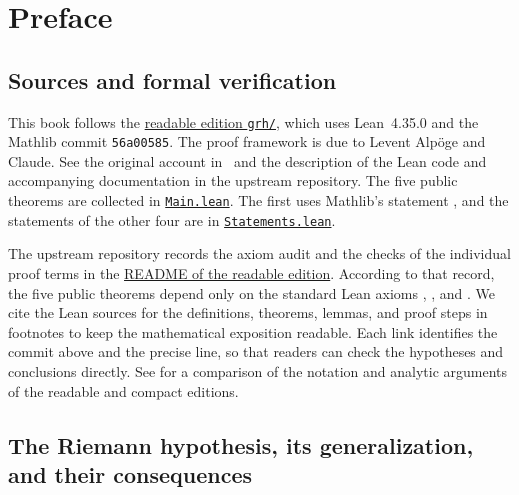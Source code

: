 \chapter*{Preface}

\section*{Sources and formal verification}

This book follows the
\href{https://github.com/lsernau/grh-lean/tree/72fead102f663d5c7a407964a13dc0cf9d977207/grh}{readable edition \texttt{grh/}},
which uses Lean~4.35.0 and the Mathlib commit \texttt{56a00585}. The proof framework is due to Levent Alpöge and Claude. See the original account in~\cite{Alpoge2026} and the description of the Lean code and accompanying documentation in the upstream repository. The five public theorems are collected in
\href{https://github.com/lsernau/grh-lean/blob/72fead102f663d5c7a407964a13dc0cf9d977207/grh/src/Main.lean}{\texttt{Main.lean}}.
The first uses Mathlib's statement
,
and the statements of the other four are in
\href{https://github.com/lsernau/grh-lean/blob/72fead102f663d5c7a407964a13dc0cf9d977207/grh/src/Statements.lean}{\texttt{Statements.lean}}.

The upstream repository records the axiom audit and the checks of the individual proof terms in the
\href{https://github.com/lsernau/grh-lean/blob/72fead102f663d5c7a407964a13dc0cf9d977207/grh/README.md}{README of the readable edition}.
According to that record, the five public theorems depend only on the standard Lean axioms , , and . We cite the Lean sources for the definitions, theorems, lemmas, and proof steps in footnotes to keep the mathematical exposition readable. Each link identifies the commit above and the precise line, so that readers can check the hypotheses and conclusions directly. See  for a comparison of the notation and analytic arguments of the readable and compact editions.

\section*{The Riemann hypothesis, its generalization, and their consequences}

